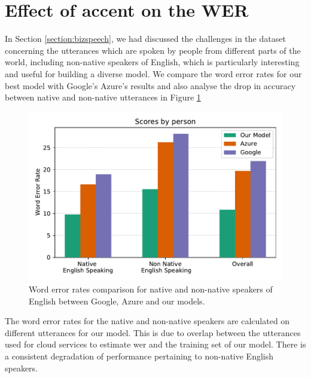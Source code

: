 \section{Effect of accent on the WER}
In Section \ref{section:bizspeech}, we had discussed the challenges in the dataset concerning the utterances which are spoken by people from different parts of the world, including non-native speakers of English, which is particularly interesting and useful for building a diverse model. We compare the word error rates for our best model with Google's Azure's results and also analyse the drop in accuracy between native and non-native utterances in Figure \ref{fig:wer_cloud_final} 

\begin{figure}[ht]
  \begin{center}
    \includegraphics[width=\textwidth]{images/wer_cloud_final.pdf} 
    \caption{Word error rates comparison for native and non-native speakers of English between Google, Azure and our models.}
    \label{fig:wer_cloud_final}
  \end{center}
\end{figure}

The word error rates for the native and non-native speakers are calculated on different utterances for our model. This is due to overlap between the utterances used for cloud services to estimate \acrshort{wer} and the training set of our model. There is a consistent degradation of performance pertaining to non-native English speakers. 

